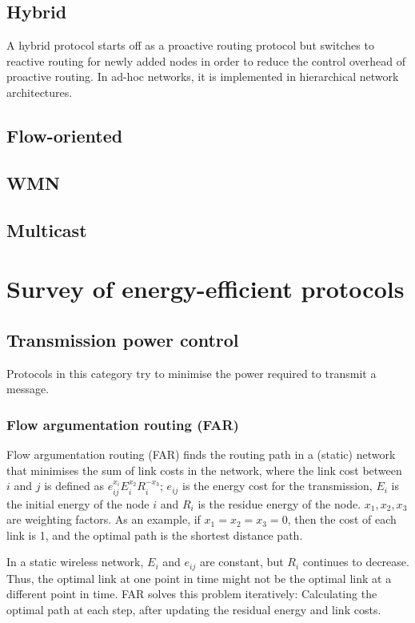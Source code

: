 \documentclass[conference]{IEEEtran}
\begin{document}
\subsection{Hybrid}
A hybrid protocol starts off as a proactive routing protocol but switches
to reactive routing for newly added nodes in order to reduce the control
overhead of proactive routing. In ad-hoc networks, it is implemented in
hierarchical network architectures.

\subsection{Flow-oriented}
\subsection{WMN}
\subsection{Multicast}

\section{Survey of energy-efficient protocols}
\subsection{Transmission power control}
Protocols in this category try to minimise the power required to transmit
a message.

\subsubsection{Flow argumentation routing (FAR)}
Flow argumentation routing (FAR)\cite{chang2000energy} finds the routing
path in a (static) network that minimises the sum of link costs in the network,
where the link cost between $i$ and $j$ is defined as \( e_{ij}^{x_{i}}E_{i}^{x_{2}}R_{i}^{-x_{3}}\);
\(e_{ij}\) is the energy cost for the transmission, $E_{i}$ is the initial energy
of the node $i$ and $R_{i}$ is the residue energy of the node. \(x_{1}, x_{2}, x_{3}\)
are weighting factors. As an example, if $x_{1}=x_{2}=x_{3}=0$, then the cost
of each link is 1, and the optimal path is the shortest distance path.

In a static wireless network, $E_{i}$ and $e_{ij}$ are constant, but $R_{i}$
continues to decrease. Thus, the optimal link at one point in time might not be the
optimal link at a different point in time. FAR solves this problem iteratively:
Calculating the optimal path at each step, after updating the residual energy
and link costs.
\end{document}
